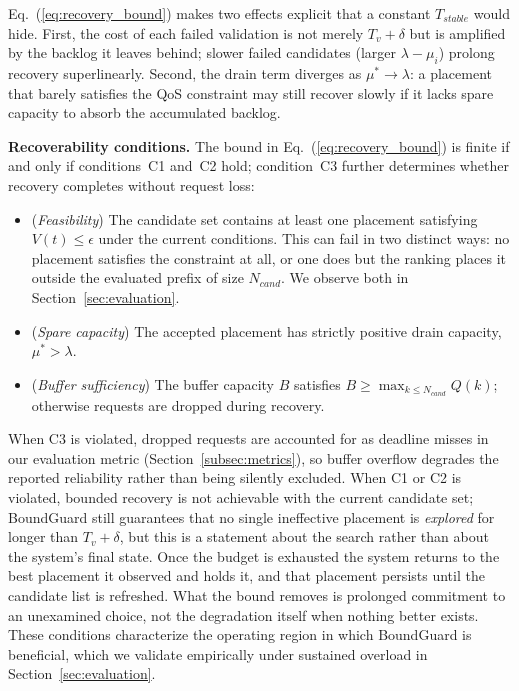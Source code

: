 \documentclass[conference]{IEEEtran}
\begin{document}
Eq.~(\ref{eq:recovery_bound}) makes two effects explicit that a constant $T_{stable}$ would hide. First, the cost of each failed validation is not merely $T_v + \delta$ but is amplified by the backlog it leaves behind; slower failed candidates (larger $\lambda - \mu_i$) prolong recovery superlinearly. Second, the drain term diverges as $\mu^{\ast} \rightarrow \lambda$: a placement that barely satisfies the QoS constraint may still recover slowly if it lacks spare capacity to absorb the accumulated backlog.

\noindent\textbf{Recoverability conditions.}
The bound in Eq.~(\ref{eq:recovery_bound}) is finite if and only if conditions~C1 and~C2 hold; condition~C3 further determines whether recovery completes without request loss:
\begin{itemize}
\item[\textbf{C1}] (\emph{Feasibility}) The candidate set contains at least one placement satisfying $V(t) \le \epsilon$ under the current conditions. \textcolor{navyblue}{This can fail in two distinct ways: no placement satisfies the constraint at all, or one does but the ranking places it outside the evaluated prefix of size $N_{cand}$. We observe both in Section~\ref{sec:evaluation}.}
\item[\textbf{C2}] (\emph{Spare capacity}) The accepted placement has strictly positive drain capacity, $\mu^{\ast} > \lambda$.
\item[\textbf{C3}] (\emph{Buffer sufficiency}) The buffer capacity $B$ satisfies $B \ge \max_{k \le N_{cand}} Q(k)$; otherwise requests are dropped during recovery.
\end{itemize}
When C3 is violated, dropped requests are accounted for as deadline misses in our evaluation metric (\textcolor{navyblue}{Section~\ref{subsec:metrics}}), so buffer overflow degrades the reported reliability rather than being silently excluded. When C1 or C2 is violated, bounded recovery is not achievable with the current candidate set; BoundGuard still guarantees that no single ineffective placement is \emph{explored} for longer than $T_v + \delta$, \textcolor{navyblue}{but this is a statement about the search rather than about the system's final state. Once the budget is exhausted the system returns to the best placement it observed and holds it, and that placement persists until the candidate list is refreshed. What the bound removes is prolonged commitment to an unexamined choice, not the degradation itself when nothing better exists.} These conditions characterize the operating region in which BoundGuard is beneficial, which we validate empirically under sustained overload in Section~\ref{sec:evaluation}.
\end{document}
